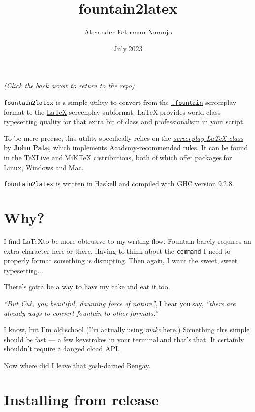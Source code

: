 \documentclass[11pt]{article}
\author{Alexander Feterman Naranjo}
\date{July 2023}
\title{fountain2latex}
\newcommand{\link}[2]{\textcolor{Blue}{\href{#1}{#2}}}
\begin{document}
\maketitle

\begin{center}
\scriptsize{\emph{(Click the back arrow to return to the repo)}}
\end{center}

\texttt{fountain2latex} is a simple utility to convert from the
\texttt{\link{https://fountain.io/}{.fountain}} screenplay format to
the \link{https://www.latex-project.org/}{\LaTeX} screenplay subformat.
{\LaTeX} provides world-class typesetting quality for that extra bit of
class and professionalism in your script.

To be more precise, this utility specifically relies on the
\emph{\link{https://www.ctan.org/pkg/screenplay}{screenplay {\LaTeX} class}}
by \textbf{John Pate}, which implements Academy-recommended rules. It can be
found in the \link{https://tug.org/texlive/}{TeXLive} and
\link{https://miktex.org/}{MiKTeX} distributions, both of which offer
packages for Linux, Windows and Mac.

\texttt{fountain2latex} is written in \link{https://haskell.org}{Haskell}
and compiled with GHC version 9.2.8.


\section*{Why?}

I find \LaTeX to be more obtrusive to my writing flow. Fountain barely
requires an extra character here or there. Having to think about the
\texttt{command} I need to properly format something is disrupting.
Then again, I want the sweet, sweet typesetting...

There's gotta be a way to have my cake and eat it too.

\emph{``But Cub, you beautiful, daunting force of nature''}, I hear you say,
\emph{``there are already ways to convert fountain to other formats.''}

I know, but I'm old school (I'm actually using \emph{make} here.)
Something this simple should be fast --- a few keystrokes in your
terminal and that's that. It certainly shouldn't require a danged
cloud API.

Now where did I leave that gosh-darned Bengay.


\section*{Installing from release}
\end{document}

